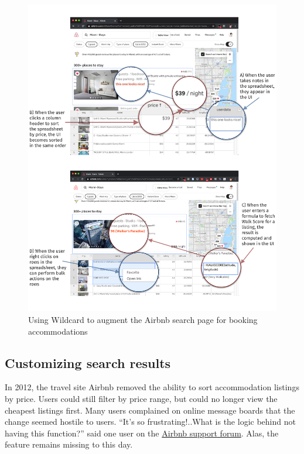 \documentclass[english,submission]{programming}
\begin{document}
\begin{figure}
\hypertarget{fig:airbnb-demo}{%
\centering
\includegraphics{media/airbnb-demo-300dpi.png}
\caption{Using Wildcard to augment the Airbnb search page for booking
accommodations}\label{fig:airbnb-demo}
}
\end{figure}

\hypertarget{customizing-search-results}{%
\subsection{Customizing search
results}\label{customizing-search-results}}

In 2012, the travel site Airbnb removed the ability to sort
accommodation listings by price. Users could still filter by price
range, but could no longer view the cheapest listings first. Many users
complained on online message boards that the change seemed hostile to
users. ``It's so frustrating!..What is the logic behind not having this
function?'' said one user on the
\href{https://community.withairbnb.com/t5/Hosting/Sorting-listing-by-price/td-p/559404}{Airbnb
support forum}. Alas, the feature remains missing to this day.
\end{document}
